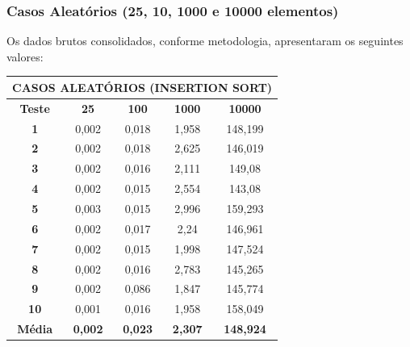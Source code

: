 \documentclass[a4paper, 12pt]{article}
\begin{document}
\subsubsection{Casos Aleatórios (25, 10, 1000 e 10000 elementos)}

Os dados brutos consolidados, conforme metodologia, apresentaram os seguintes valores:
\vspace{0.2cm}

\begin{minipage}{1.0\textwidth}
  \begin{minipage}[c]{0.49\textwidth}
  \centering
\begin{tabular}{ccccc}

                   \multicolumn{ 5}{c}{{\bf CASOS ALEATÓRIOS (INSERTION SORT)}} \\
\hline
{\bf Teste} &   {\bf 25} &  {\bf 100} & {\bf 1000} & {\bf 10000} \\
\hline
   {\bf 1} &      0,002 &      0,018 &      1,958 &    148,199 \\
\hline
   {\bf 2} &      0,002 &      0,018 &      2,625 &    146,019 \\
\hline
   {\bf 3} &      0,002 &      0,016 &      2,111 &     149,08 \\
\hline
   {\bf 4} &      0,002 &      0,015 &      2,554 &     143,08 \\
\hline
   {\bf 5} &      0,003 &      0,015 &      2,996 &    159,293 \\
\hline
   {\bf 6} &      0,002 &      0,017 &       2,24 &    146,961 \\
\hline
   {\bf 7} &      0,002 &      0,015 &      1,998 &    147,524 \\
\hline
   {\bf 8} &      0,002 &      0,016 &      2,783 &    145,265 \\
\hline
   {\bf 9} &      0,002 &      0,086 &      1,847 &    145,774 \\
\hline
  {\bf 10} &      0,001 &      0,016 &      1,958 &    158,049 \\
\hline
{\bf Média} & {\bf 0,002} & {\bf 0,023} & {\bf 2,307} & {\bf 148,924} \\
\hline
\end{tabular}  

  \end{minipage}
 \hfill
 \begin{minipage}[c]{0.49\textwidth}
 \centering
{}
\end{minipage}
\end{minipage}
\end{document}
